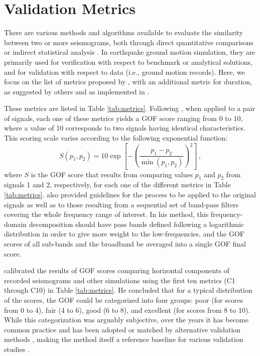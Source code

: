 
\section{Validation Metrics} 
\label{sec:validation-metrics}

There are various methods and algorithms available to evaluate the similarity between two or more seismograms, both through direct quantitative comparisons or indirect statistical analysis \citep[e.g.,][]{Anderson_2004_Proc, Kristekova_2006_BSSA, Kristekova_2009_GJI, Olsen_2010_SRL, Burks_BSSA_2014, Rezaeian_2015_BSSA}. In earthquake ground motion simulation, they are primarily used for verification with respect to benchmark or analytical solutions, and for validation with respect to data (i.e., ground motion records). Here, we focus on the list of metrics proposed by \citet{Anderson_2004_Proc}, with an additional metric for duration, as suggested by others \citep{Olsen_2010_SRL, Maufroy_2015_BSSA} and as implemented in \citet{Taborda_2013_BSSA}.



These metrics are listed in Table \ref{tab:metrics}. Following \citet{Anderson_2004_Proc}, when applied to a pair of signals, each one of these metrics yields a GOF score ranging from 0 to 10, where a value of 10 corresponds to two signals having identical characteristics. This scoring scale varies according to the following exponential function:
% 
\begin{equation}
\label{eq:gof-function}
	S \left( p_1, p_2 \right) = 10 \exp{ \left[ - \left( \frac{p_1 - p_2}{ \min\left( p_1, p_2 \right) } \right)^2 \right] }
	\, ,
\end{equation}
% 
\noindent
where $S$ is the GOF score that results from comparing values $p_1$ and $p_2$ from signals 1 and 2, respectively, for each one of the different metrics in Table \ref{tab:metrics}. \citeauthor{Anderson_2004_Proc} also provided guidelines for the process to be applied to the original signals as well as to those resulting from a sequential set of band-pass filters covering the whole frequency range of interest. In his method, this frequency-domain decomposition should have pass bands defined following a logarithmic distribution in order to give more weight to the low-frequencies, and the GOF scores of all sub-bands and the broadband be averaged into a single GOF final score.

\citet{Anderson_2004_Proc} calibrated the results of GOF scores comparing horizontal components of recorded seismograms and other simulations using the first ten metrics (C1 through C10) in Table \ref{tab:metrics}. He concluded that for a typical distribution of the scores, the GOF could be categorized into four groups: poor (for scores from 0 to 4), fair (4 to 6), good (6 to 8), and excellent (for scores from 8 to 10). While this categorization was arguably subjective, over the years it has become common practice and has been adopted or matched by alternative validation methods \citep[e.g.,][]{Kristekova_2009_GJI, Olsen_2010_SRL}, making the method itself a reference baseline for various validation studies \citep[e.g.,][]{Chaljub_2010_BSSA, Bielak_2010_GJI, Guidotti_2011_SRL, Maufroy_2015_BSSA}.

